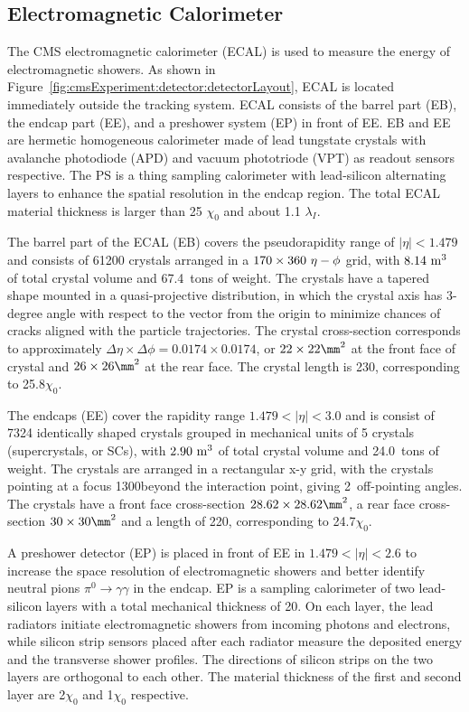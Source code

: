 \subsection{Electromagnetic Calorimeter}
The CMS electromagnetic calorimeter (ECAL) \cite{cms:ecalTdr:CMS:1997ysd} is used to measure the energy of electromagnetic showers. As shown in Figure~\ref{fig:cmsExperiment:detector:detectorLayout}, ECAL is located immediately outside the tracking system. ECAL consists of the barrel part (EB), the endcap part (EE), and a preshower system (EP) in front of EE. EB and EE are hermetic homogeneous calorimeter made of lead tungstate crystals with avalanche photodiode (APD) and vacuum phototriode (VPT)  as readout sensors respective. The PS is a thing sampling calorimeter with lead-silicon alternating layers to enhance the spatial resolution in the endcap region. The total ECAL material thickness is larger than 25 $\chi_0$ and about 1.1 $\lambda_I$.

The barrel part of the ECAL (EB) covers the pseudorapidity range of $|\eta|< 1.479$ and consists of 61200 crystals arranged in a $\rm 170\times360 ~ \eta - \phi$ grid, with $\rm 8.14~m^3$ of total crystal volume and 67.4~tons of weight. The crystals have a tapered shape mounted in a quasi-projective distribution, in which the crystal axis has 3-degree angle with respect to the vector from the origin to minimize chances of cracks aligned with the particle trajectories. The crystal cross-section corresponds to approximately $\Delta \eta \times \Delta\phi = 0.0174 \times 0.0174$, or $\rm 22 \times 22 \mm^2$ at the front face of crystal and $\rm 26\times26 \mm^2$ at the rear face. The crystal length is 230\mm, corresponding to 25.8$\chi_0$.

The endcaps (EE) cover the rapidity range $1.479 < |\eta| < 3.0$ and is consist of 7324 identically shaped crystals grouped in mechanical units of 5 crystals (supercrystals, or SCs), with $\rm 2.90~m^3$ of total crystal volume and 24.0~tons of weight. The crystals are arranged in a rectangular x-y grid, with the crystals pointing at a focus 1300\mm beyond the interaction point, giving 2\de ~off-pointing angles. The crystals have a front face cross-section $\rm 28.62\times28.62 \mm^2$, a rear face cross-section $\rm 30\times30 \mm^2$ and a length of 220\mm, corresponding to 24.7$\chi_0$.

A preshower detector (EP) is placed in front of EE in $1.479 < |\eta| < 2.6$ to increase the space resolution of electromagnetic showers and better identify neutral pions $\pi^0 \to \gamma \gamma$ in the endcap. EP is a sampling calorimeter of two lead-silicon layers with a total mechanical thickness of 20\cm. On each layer, the lead radiators initiate electromagnetic showers from incoming photons and electrons, while silicon strip sensors placed after each radiator measure the deposited energy and the transverse shower profiles. The directions of silicon strips on the two layers are orthogonal to each other. The material thickness of the first and second layer are 2$\chi_0$ and 1$\chi_0$ respective.



